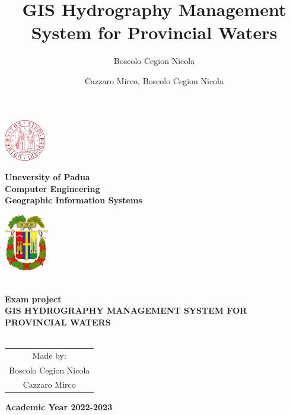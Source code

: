 \documentclass[a4paper, 11pt]{article}
\title{GIS Hydrography Management System for Provincial Waters}
\author{Boscolo Cegion Nicola}
\author{Cazzaro Mirco, Boscolo Cegion Nicola}
\date{}
\begin{document}
\begin{center}
	\begin{minipage}{2.5cm}
	\begin{center}
		\includegraphics[height=1.8cm]{img/unipd.png}
		
	\end{center}
\end{minipage}\hfill
\begin{minipage}{10cm}
	\begin{center}
	\textbf{Uneversity of Padua}\\[0.1cm]
    \textbf{Computer Engineering}\\[0.1cm]
    \textbf{Geographic Information Systems}


	\end{center}
\end{minipage}\hfill
\begin{minipage}{2.5cm}
	\begin{center}
		\includegraphics[height=2.5cm]{img/belluno.png}
	\end{center}

\end{minipage}



\textsc{\Large }\\[1.5cm]
{\large \bfseries Exam project}\\[4.5cm]


{\huge \bfseries \uppercase{GIS Hydrography Management System for Provincial Waters} \\[0.5cm] }
\textsc{\Large }\\[2.5cm]







\begin{tabular}{c}
    Made by:\\[0.5cm]
    {\LARGE Boscolo Cegion Nicola}\\[0.1cm]
    {\LARGE Cazzaro Mirco}\\[0.1cm]
    
\end{tabular}
\vfill

{\textbf{\large {Academic Year} 2022-2023}}

\end{center}
\end{document}
